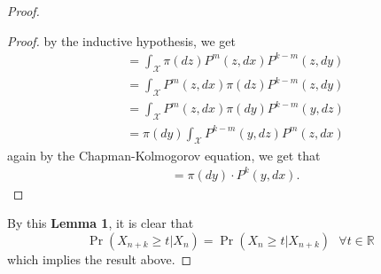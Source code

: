 \begin{theorem}
\begin{proof}
\begin{lem}
\begin{proof}
                by the inductive hypothesis, we get
                \begin{align*}
                    &= \int_{\mathcal{X}} \pi(dz) P^m(z, dx) P^{k-m}(z, dy) \\
                    &= \int_{\mathcal{X}} P^m(z, dx) \pi(dz) P^{k-m}(z, dy) \\
                    &= \int_{\mathcal{X}} P^m(z, dx) \pi(dy) P^{k-m}(y, dz) \\
                    &= \pi(dy) \int_{\mathcal{X}}  P^{k-m}(y, dz) P^m(z, dx)
                \end{align*}
                again by the Chapman-Kolmogorov equation, we get that
                \begin{align*}
                    &= \pi(dy) \cdot P^k(y, dx).
                \end{align*}
            \end{proof}
        \end{lem}
        By this \textbf{Lemma 1}, it is clear that
        \begin{equation*}
            \Pr (X_{n+k} \geq t | X_n) = \Pr (X_n \geq t | X_{n+k}) \text{  } \forall t \in \mathbb{R}
        \end{equation*}
        which implies the result above.
    \end{proof}
\end{theorem}

